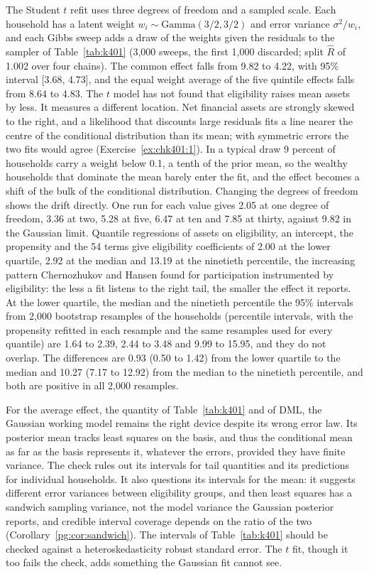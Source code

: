 The Student $t$ refit uses three degrees of freedom and a sampled scale. Each household has a latent weight $w_i \sim \mathrm{Gamma}(3/2, 3/2)$ and error variance $\sigma^2/w_i$, and each Gibbs sweep adds a draw of the weights given the residuals to the sampler of Table~\ref{tab:k401} (3,000 sweeps, the first 1,000 discarded; split $\hat R$ of 1.002 over four chains). The common effect falls from 9.82 to 4.22, with 95\% interval [3.68, 4.73], and the equal weight average of the five quintile effects falls from 8.64 to 4.83. The $t$ model has not found that eligibility raises mean assets by less. It measures a different location. Net financial assets are strongly skewed to the right, and a likelihood that discounts large residuals fits a line nearer the centre of the conditional distribution than its mean; with symmetric errors the two fits would agree (Exercise~\ref{ex:chk401:1}). In a typical draw 9 percent of households carry a weight below 0.1, a tenth of the prior mean, so the wealthy households that dominate the mean barely enter the fit, and the effect becomes a shift of the bulk of the conditional distribution. Changing the degrees of freedom shows the drift directly. One run for each value gives 2.05 at one degree of freedom, 3.36 at two, 5.28 at five, 6.47 at ten and 7.85 at thirty, against 9.82 in the Gaussian limit. Quantile regressions of assets on eligibility, an intercept, the propensity and the 54 terms give eligibility coefficients of 2.00 at the lower quartile, 2.92 at the median and 13.19 at the ninetieth percentile, the increasing pattern Chernozhukov and Hansen found for participation instrumented by eligibility: the less a fit listens to the right tail, the smaller the effect it reports. At the lower quartile, the median and the ninetieth percentile the 95\% intervals from 2,000 bootstrap resamples of the households (percentile intervals, with the propensity refitted in each resample and the same resamples used for every quantile) are 1.64 to 2.39, 2.44 to 3.48 and 9.99 to 15.95, and they do not overlap. The differences are 0.93 (0.50 to 1.42) from the lower quartile to the median and 10.27 (7.17 to 12.92) from the median to the ninetieth percentile, and both are positive in all 2,000 resamples.

For the average effect, the quantity of Table~\ref{tab:k401} and of DML, the Gaussian working model remains the right device despite its wrong error law. Its posterior mean tracks least squares on the basis, and thus the conditional mean as far as the basis represents it, whatever the errors, provided they have finite variance. The check rules out its intervals for tail quantities and its predictions for individual households. It also questions its intervals for the mean: it suggests different error variances between eligibility groups, and then least squares has a sandwich sampling variance, not the model variance the Gaussian posterior reports, and credible interval coverage depends on the ratio of the two (Corollary~\ref{pg:cor:sandwich}). The intervals of Table~\ref{tab:k401} should be checked against a heteroskedasticity robust standard error. The $t$ fit, though it too fails the check, adds something the Gaussian fit cannot see.

